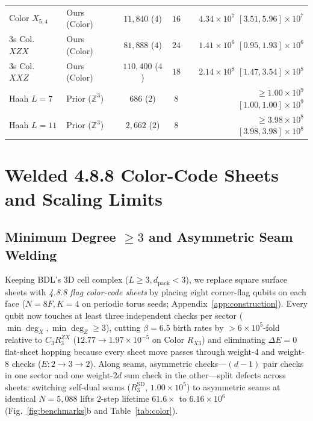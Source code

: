 \documentclass[aps,prx,reprint,superscriptaddress,nofootinbib,floatfix]{revtex4-2}
\begin{document}
\begin{table}[tbp]
{\begin{ruledtabular}
\begin{tabular}{llccr}
Color $X_{5,4}$ & Ours (Color) & $11{,}840$ ($4$) & $16$ & $4.34{\times}10^7$ $[3.51, 5.96]{\times}10^7$ \\
3s Col.\ $XZX$ & Ours (Color) & $81{,}888$ ($4$) & $24$ & $1.41{\times}10^6$ $[0.95, 1.93]{\times}10^6$ \\
3s Col.\ $XXZ$ & Ours (Color) & $110{,}400$ ($4$) & $18$ & $2.14{\times}10^8$ $[1.47, 3.54]{\times}10^8$ \\
\colrule
Haah $L{=}7$ & Prior ($\mathbb{Z}^3$) & $686$ ($2$) & $8$ & ${\ge}1.00{\times}10^9$ $[1.00, 1.00]{\times}10^9$ \\
Haah $L{=}11$ & Prior ($\mathbb{Z}^3$) & $2{,}662$ ($2$) & $8$ & ${\ge}3.98{\times}10^8$ $[3.98, 3.98]{\times}10^8$ \\
\end{tabular}
\end{ruledtabular}
}
\end{table}

\section{Welded 4.8.8 Color-Code Sheets and Scaling Limits}
\label{sec:color}

\subsection{Minimum Degree \texorpdfstring{$\ge 3$}{>= 3} and Asymmetric Seam Welding}

Keeping BDL's 3D cell complex ($L \ge 3, d_{\mathrm{pack}} < 3$), we replace square surface sheets with \emph{4.8.8 flag color-code sheets} \cite{bombin2006color, kubica2015color} by placing eight corner-flag qubits on each face ($N = 8F, K = 4$ on periodic torus seeds; Appendix~\ref{app:construction}). Every qubit now touches at least three independent checks per sector ($\min\deg_X, \min\deg_Z \ge 3$), cutting $\beta = 6.5$ birth rates by $> 6 \times 10^5$-fold relative to $C_3 R_3^{ZX}$ ($12.77 \to 1.97 \times 10^{-5}$ on Color $R_{X3}$) and eliminating $\Delta E = 0$ flat-sheet hopping because every sheet move passes through weight-4 and weight-8 checks ($E: 2 \to 3 \to 2$). Along seams, asymmetric checks---$(d - 1)$ pair checks in one sector and one weight-$2d$ sum check in the other---split defects across sheets: switching self-dual seams ($R_3^{\mathrm{SD}}$, $1.00 \times 10^5$) to asymmetric seams at identical $N = 5{,}088$ lifts 2-step lifetime $61.6\times$ to $6.16 \times 10^6$ (Fig.~\ref{fig:benchmarks}b and Table~\ref{tab:color}).
\end{document}
